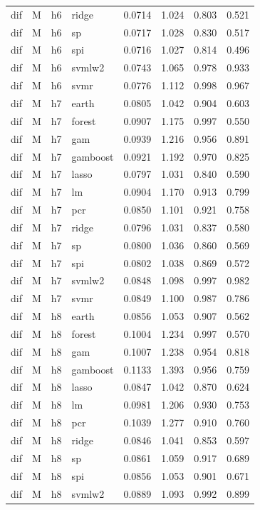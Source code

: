 \begin{ThreePartTable}
\begin{longtable}[t]{llclcccc}
dif & M & h6 & ridge & 0.0714 & 1.024 & 0.803 & 0.521\\
dif & M & h6 & sp & 0.0717 & 1.028 & 0.830 & 0.517\\
dif & M & h6 & spi & 0.0716 & 1.027 & 0.814 & 0.496\\
dif & M & h6 & svmlw2 & 0.0743 & 1.065 & 0.978 & 0.933\\
dif & M & h6 & svmr & 0.0776 & 1.112 & 0.998 & 0.967\\
\addlinespace
dif & M & h7 & earth & 0.0805 & 1.042 & 0.904 & 0.603\\
dif & M & h7 & forest & 0.0907 & 1.175 & 0.997 & 0.550\\
dif & M & h7 & gam & 0.0939 & 1.216 & 0.956 & 0.891\\
dif & M & h7 & gamboost & 0.0921 & 1.192 & 0.970 & 0.825\\
dif & M & h7 & lasso & 0.0797 & 1.031 & 0.840 & 0.590\\
dif & M & h7 & lm & 0.0904 & 1.170 & 0.913 & 0.799\\
dif & M & h7 & pcr & 0.0850 & 1.101 & 0.921 & 0.758\\
dif & M & h7 & ridge & 0.0796 & 1.031 & 0.837 & 0.580\\
dif & M & h7 & sp & 0.0800 & 1.036 & 0.860 & 0.569\\
dif & M & h7 & spi & 0.0802 & 1.038 & 0.869 & 0.572\\
dif & M & h7 & svmlw2 & 0.0848 & 1.098 & 0.997 & 0.982\\
dif & M & h7 & svmr & 0.0849 & 1.100 & 0.987 & 0.786\\
\addlinespace
dif & M & h8 & earth & 0.0856 & 1.053 & 0.907 & 0.562\\
dif & M & h8 & forest & 0.1004 & 1.234 & 0.997 & 0.570\\
dif & M & h8 & gam & 0.1007 & 1.238 & 0.954 & 0.818\\
dif & M & h8 & gamboost & 0.1133 & 1.393 & 0.956 & 0.759\\
dif & M & h8 & lasso & 0.0847 & 1.042 & 0.870 & 0.624\\
dif & M & h8 & lm & 0.0981 & 1.206 & 0.930 & 0.753\\
dif & M & h8 & pcr & 0.1039 & 1.277 & 0.910 & 0.760\\
dif & M & h8 & ridge & 0.0846 & 1.041 & 0.853 & 0.597\\
dif & M & h8 & sp & 0.0861 & 1.059 & 0.917 & 0.689\\
dif & M & h8 & spi & 0.0856 & 1.053 & 0.901 & 0.671\\
dif & M & h8 & svmlw2 & 0.0889 & 1.093 & 0.992 & 0.899\\

\end{longtable}
\end{ThreePartTable}
